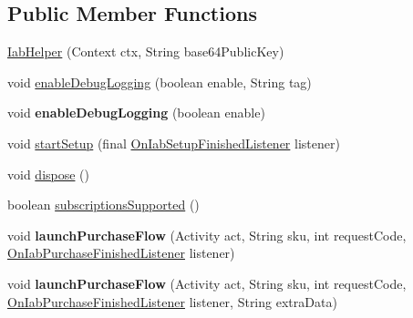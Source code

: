 \subsection*{Public Member Functions}
\begin{DoxyCompactItemize}
\item 
\hyperlink{classorg_1_1cocos2dx_1_1plugin_1_1util_1_1IabHelper_a4161283ba1134bbc0d80466c05010872}{Iab\+Helper} (Context ctx, String base64\+Public\+Key)
\item 
void \hyperlink{classorg_1_1cocos2dx_1_1plugin_1_1util_1_1IabHelper_ac452c2ebaa245349df0a1a49f67f918d}{enable\+Debug\+Logging} (boolean enable, String tag)
\item 
\mbox{\label{classorg_1_1cocos2dx_1_1plugin_1_1util_1_1IabHelper_a4917ce215ca9381264db6a37e3f90a85}} 
void {\bfseries enable\+Debug\+Logging} (boolean enable)
\item 
void \hyperlink{classorg_1_1cocos2dx_1_1plugin_1_1util_1_1IabHelper_a4eb405a91ab5d6d6bb94a69ac0c54ec3}{start\+Setup} (final \hyperlink{interfaceorg_1_1cocos2dx_1_1plugin_1_1util_1_1IabHelper_1_1OnIabSetupFinishedListener}{On\+Iab\+Setup\+Finished\+Listener} listener)
\item 
void \hyperlink{classorg_1_1cocos2dx_1_1plugin_1_1util_1_1IabHelper_add41920802456afa1594822fc5e4b93d}{dispose} ()
\item 
boolean \hyperlink{classorg_1_1cocos2dx_1_1plugin_1_1util_1_1IabHelper_a06ba80f6caa38961b4e6339d7bb8c598}{subscriptions\+Supported} ()
\item 
\mbox{\label{classorg_1_1cocos2dx_1_1plugin_1_1util_1_1IabHelper_aed90c48537f1d4b6e45763823bd2fc81}} 
void {\bfseries launch\+Purchase\+Flow} (Activity act, String sku, int request\+Code, \hyperlink{interfaceorg_1_1cocos2dx_1_1plugin_1_1util_1_1IabHelper_1_1OnIabPurchaseFinishedListener}{On\+Iab\+Purchase\+Finished\+Listener} listener)
\item 
\mbox{\label{classorg_1_1cocos2dx_1_1plugin_1_1util_1_1IabHelper_a5b2df519b9a91af785266b7f9a683566}} 
void {\bfseries launch\+Purchase\+Flow} (Activity act, String sku, int request\+Code, \hyperlink{interfaceorg_1_1cocos2dx_1_1plugin_1_1util_1_1IabHelper_1_1OnIabPurchaseFinishedListener}{On\+Iab\+Purchase\+Finished\+Listener} listener, String extra\+Data)

\end{DoxyCompactItemize}
